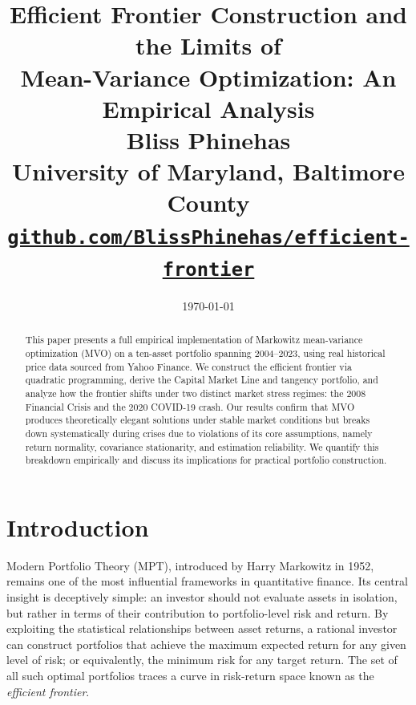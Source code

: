 \documentclass[12pt]{article}
\title{
  \Large\textbf{Efficient Frontier Construction and the Limits of} \\
  \Large\textbf{Mean-Variance Optimization: An Empirical Analysis} \\[0.5em]
  \normalsize Bliss Phinehas \\[0.3em]
  \normalsize University of Maryland, Baltimore County \\[0.3em]
  \normalsize \href{https://github.com/BlissPhinehas/efficient-frontier}%
    {\texttt{github.com/BlissPhinehas/efficient-frontier}}
}
\date{\today}
\begin{document}
\maketitle
\thispagestyle{empty}

\begin{abstract}
This paper presents a full empirical implementation of Markowitz mean-variance
optimization (MVO) on a ten-asset portfolio spanning 2004--2023, using real
historical price data sourced from Yahoo Finance. We construct the efficient
frontier via quadratic programming, derive the Capital Market Line and tangency
portfolio, and analyze how the frontier shifts under two distinct market stress
regimes: the 2008 Financial Crisis and the 2020 COVID-19 crash. Our results
confirm that MVO produces theoretically elegant solutions under stable market
conditions but breaks down systematically during crises due to violations of
its core assumptions, namely return normality, covariance stationarity, and
estimation reliability. We quantify this breakdown empirically and discuss
its implications for practical portfolio construction.
\end{abstract}

\newpage

\setcounter{page}{2}
\tableofcontents
\thispagestyle{empty}

\newpage
\setcounter{page}{1}
\doublespacing

\section{Introduction}

Modern Portfolio Theory (MPT), introduced by Harry Markowitz in 1952, remains
one of the most influential frameworks in quantitative finance. Its central
insight is deceptively simple: an investor should not evaluate assets in
isolation, but rather in terms of their contribution to portfolio-level risk
and return. By exploiting the statistical relationships between asset returns,
a rational investor can construct portfolios that achieve the maximum expected
return for any given level of risk; or equivalently, the minimum risk for any
target return. The set of all such optimal portfolios traces a curve in
risk-return space known as the \textit{efficient frontier}.
\end{document}
